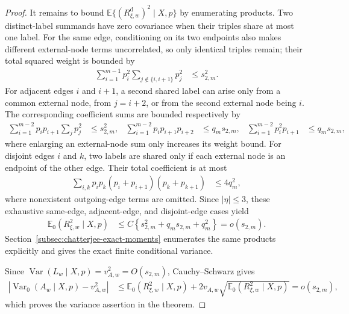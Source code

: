 \begin{proof}
It remains to bound $\mathbb E\{(R_{\xi,w}^{\mathrm d})^2\mid X,p\}$ by
enumerating products. Two distinct-label summands have zero covariance when
their triples share at most one label. For the same edge, conditioning on its
two endpoints also makes different external-node terms uncorrelated, so only
identical triples remain; their total squared weight is bounded by
\begin{align*}
  \sum_{i=1}^{m-1}p_i^2
    \sum_{j\notin\{i,i+1\}}p_j^2
  &\leq s_{2,m}^2.
\end{align*}
For adjacent edges $i$ and $i+1$, a second shared label can arise only from
a common external node, from $j=i+2$, or from the second external node being
$i$. The corresponding coefficient sums are bounded respectively by
\begin{align*}
  \sum_{i=1}^{m-2}p_ip_{i+1}\sum_jp_j^2
  &\leq s_{2,m}^2,
  &
  \sum_{i=1}^{m-2}p_ip_{i+1}p_{i+2}
  &\leq q_m s_{2,m},
  &
  \sum_{i=1}^{m-2}p_i^2p_{i+1}
  &\leq q_m s_{2,m},
\end{align*}
where enlarging an external-node sum only increases its weight bound. For
disjoint edges $i$ and $k$, two labels are shared only if each external node
is an endpoint of the other edge. Their total coefficient is at most
\begin{align*}
  \sum_{i,k}p_ip_k(p_i+p_{i+1})(p_k+p_{k+1})
  &\leq4q_m^2,
\end{align*}
where nonexistent outgoing-edge terms are omitted. Since $|\eta|\leq3$,
these exhaustive same-edge, adjacent-edge, and disjoint-edge cases yield
\begin{align*}
  \mathbb{E}_0(R_{\xi,w}^2\mid X,p)
  &\leq C\left\{
    s_{2,m}^2+q_ms_{2,m}+q_m^2
  \right\}
  =o(s_{2,m}).
\end{align*}
Section~\ref{subsec:chatterjee-exact-moments} enumerates the same products
explicitly and gives the exact finite conditional variance.

Since $\operatorname{Var}(L_w\mid X,p)=v_{A,w}^2=O(s_{2,m})$,
Cauchy--Schwarz gives
\begin{align*}
  \left|
    \operatorname{Var}_0(A_w\mid X,p)-v_{A,w}^2
  \right|
  &\leq
    \mathbb E_0(R_{\xi,w}^2\mid X,p)
    +2v_{A,w}
      \sqrt{\mathbb E_0(R_{\xi,w}^2\mid X,p)}
  =o(s_{2,m}),
\end{align*}
which proves the variance assertion in the theorem.


\end{proof}

